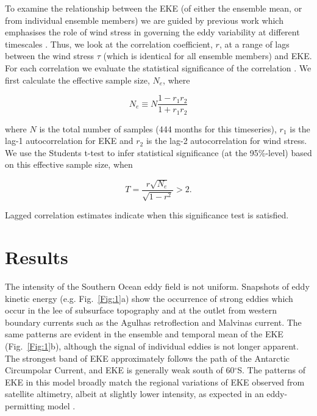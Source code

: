 \documentclass{agujournal2019}
\begin{document}
To examine the relationship between the EKE (of either the ensemble mean, or from individual ensemble members) we are guided by previous work which emphasises the role of wind stress in governing the eddy variability at different timescales \citep[e.g.][]{Hogg2015, Sinha2016}.
Thus, we look at the correlation coefficient, $r$, at a range of lags between the wind stress $\tau$ (which is identical for all ensemble members) and EKE.
For each correlation we evaluate the statistical significance of the correlation \citep[following, e.g.][]{Santer2000}.
We first calculate the effective sample size, $N_e$, where
\begin{linenomath*}
\begin{equation}
N_e \equiv N \frac{1-r_1 r_2}{1+r_1 r_2}
\end{equation}
\end{linenomath*}
where $N$ is the total number of samples (444 months for this timeseries), $r_1$ is the lag-1 autocorrelation for EKE and $r_2$ is the lag-2 autocorrelation for wind stress.
We use the Students t-test to infer statistical significance (at the 95\%-level) based on this effective sample size, when
\begin{linenomath*}
\begin{equation}
T = \frac{r \sqrt{N_e}}{\sqrt{1-r^2}} > 2.
\end{equation}
\end{linenomath*}
Lagged correlation estimates indicate when this significance test is satisfied.

\section{Results}

The intensity of the Southern Ocean eddy field is not uniform.
Snapshots of eddy kinetic energy (e.g. Fig.~\ref{Fig:1}a) show the occurrence of strong eddies which occur in the lee of subsurface topography and at the outlet from western boundary currents such as the Agulhas retroflection and Malvinas current.
The same patterns are evident in the ensemble and temporal mean of the EKE (Fig.~\ref{Fig:1}b), although the signal of individual eddies is not longer apparent.
The strongest band of EKE approximately follows the path of the Antarctic Circumpolar Current, and EKE is generally weak south of 60$^\circ$S.
The patterns of EKE in this model broadly match the regional variations of EKE observed from satellite altimetry, albeit at slightly lower intensity, as expected in an eddy-permitting model \citep[e.g.][]{Kiss2020}.
\end{document}
